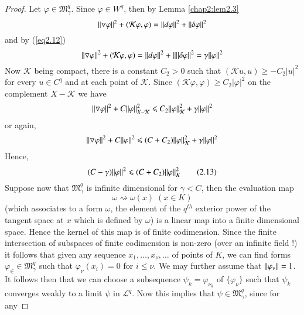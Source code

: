 \begin{proof}
  Let $\varphi \in \mathfrak{M}^q_\gamma$. Since $\varphi \in W^q$,
  then by Lemma \ref{chap2:lem2.3} 
  $$ 
  \Arrowvert \triangledown \varphi \Arrowvert^2+(\mathcal{K} \varphi,\varphi)=
  \Arrowvert d \varphi \Arrowvert^2+ \Arrowvert \delta \varphi
  \Arrowvert^2
  $$ 
  and by (\ref{eq2.12}) 
  $$ 
  \Arrowvert \triangledown \varphi \Arrowvert^2+(\mathcal{K} \varphi,\varphi)=
  \Arrowvert d \varphi \Arrowvert^2 + \Arrowvert || \delta \varphi
  \Arrowvert^2  = \gamma \Arrowvert  \varphi \Arrowvert^2
  $$
  Now $\mathcal{K}$ being compact, there is a constant $C_2>0$ such that
  $(\mathcal{K} u,u)\geqslant - C_2|u|^2$ for every $u \in C^q$ and at
  each point of $\mathcal{K}$. 
  Since $(\mathcal{K} \varphi,\varphi) \geqslant C_2 |\varphi|^2$ on the
  complement $X-\mathcal{K}$ we have 
  $$
  \Arrowvert \triangledown \varphi \Arrowvert^2 + C \Arrowvert \varphi
  \Arrowvert^2_{X-\mathcal{K}} \leqslant C_2 \Arrowvert \varphi
  \Arrowvert^2_{\mathcal{K}}  + \gamma \Arrowvert \varphi \Arrowvert^ 2
  $$
  or again,
  $$
  \Arrowvert \triangledown \varphi \Arrowvert^2 + C \Arrowvert \varphi
  \Arrowvert^2 \leqslant (C+C_2) \Arrowvert \varphi \Arrowvert^2_{\mathcal{K}} +
  \gamma \Arrowvert \varphi \Arrowvert^2
  $$
  Hence,\pageoriginale
  \begin{equation*}
    (C-\gamma) \Arrowvert \varphi \Arrowvert^2 \leqslant (C+C_2)
    \Arrowvert \varphi \Arrowvert^2_{K}  \tag{2.13}\label{eq2.13} 
  \end{equation*}
  Suppose now that $\mathfrak{M}^q_{\gamma}$ is infinite dimensional
  for $\gamma < C$, then the evaluation map
  $$ 
  \omega \rightsquigarrow \omega(x) \; (x \in K)  
  $$
  (which associates to a form $\omega$, the element of the $q^{th}$
  exterior power of the tangent space at $x$ which is defined by
  $\omega$) is a linear map  
  into a finite dimensional space. Hence the kernel of this map is of 
  finite codimension. Since the finite intersection of subspaces of
  finite codimension is non-zero (over an infinite field !) it follows  
  that given any sequence $x_1, \ldots, x_{\nu},\ldots$ of points of $K$, we 
  can find forms $\varphi_\in \in \mathfrak{M}^q_{\gamma}$ such that
  $\varphi_{\nu}(x_i)=0$  for $i \leqslant \nu$. We  
  may further assume that $\Arrowvert \varphi _{\nu} \Arrowvert =1$.
  It follows then that we can choose a subsequence $\psi_k=
  \varphi_{\nu_k}$ of  $\{\varphi_{\nu}\}$ such that $\psi_k$ 
  converges weakly to a limit $\psi$ in $\mathcal{L}^q$. Now this
  implies that $\psi \in \mathfrak{M}^q_{\gamma}$, since for any

\end{proof}
